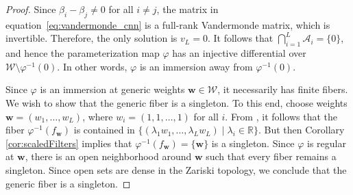 \documentclass{article} %
\def\eqref#1{equation~\ref{#1}}
\theoremstyle{plain}%
\theoremstyle{definition}
\theoremstyle{remark}
\begin{document}
\begin{proof}
 

Since $\beta_i - \beta_j \neq 0$ for all $i \neq j$, the matrix in \eqref{eq:vandermonde_cnn} is a full-rank Vandermonde matrix, which is invertible. Therefore, the only solution is $v_L=0$. It follows that $\bigcap_{i=1}^{L} \mathcal{A}_i = \{0\}$, and hence the parameterization map $\varphi$ has an injective differential over $\mathcal{W} \setminus \varphi^{-1}(0)$. In other words, $\varphi$ is an immersion away from $\varphi^{-1}(0)$.

Since $\varphi$ is an immersion at generic weights $\mathbf{w} \in \mathcal{W}$, it necessarily has finite fibers. We wish to show that the generic fiber is a singleton. To this end, choose weights $\mathbf w=(w_1,\dots,w_L)$, where $w_i=(1,1,\dots,1)$ for all $i$. From \citep[Theorem~4.6]{shahverdi2024geometryoptimizationpolynomialconvolutional}, it follows that the fiber $\varphi^{-1}(f_{\mathbf{w}})$ is contained in $\{(\lambda_1 w_1,\ldots,\lambda_L w_L) \mid \lambda_i \in \mathbb{R}\}$. But then Corollary \ref{cor:scaledFilters} implies that $\varphi^{-1}(f_{\mathbf w})=\{\mathbf w\}$ is a singleton. Since $\varphi$ is regular at $\mathbf w$, there is an open neighborhood around $\mathbf w$ such that every fiber remains a singleton. Since open sets are dense in the Zariski topology, we conclude that the generic fiber is a singleton. 
\end{proof}
\end{document}
